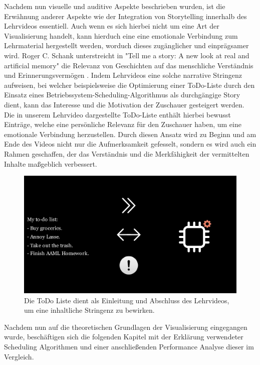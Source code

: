 Nachdem nun visuelle und auditive Aspekte beschrieben wurden, ist die Erwähnung anderer Aspekte wie der Integration von Storytelling innerhalb des Lehrvideos essentiell. Auch wenn es sich hierbei nicht um eine Art der Visualisierung handelt, kann hierduch eine eine emotionale Verbindung zum Lehrmaterial hergestellt werden, worduch dieses zugänglicher und einprägsamer wird. Roger C. Schank unterstreicht in "Tell me a story: A new look at real and artificial memory" die Relevanz von Geschichten auf das menschliche Verständnis und Erinnerungsvermögen \autocite{schank_tell_1990}. Indem Lehrvideos eine solche narrative Stringenz aufweisen, bei welcher beispielsweise die Optimierung einer ToDo-Liste durch den Einsatz eines Betriebssystem-Scheduling-Algorithmus als durchgängige Story dient, kann das Interesse und die Motivation der Zuschauer gesteigert werden. Die in unserem Lehrvideo dargestellte ToDo-Liste enthält hierbei bewusst Einträge, welche eine persönliche Relevanz für den Zuschauer haben, um eine emotionale Verbindung herzustellen. Durch diesen Ansatz wird zu Beginn und am Ende des Videos nicht nur die Aufmerksamkeit gefesselt, sondern es wird auch ein Rahmen geschaffen, der das Verständnis und die Merkfähigkeit der vermittelten Inhalte maßgeblich verbessert.


\begin{figure}[h]
	\centering
	\includegraphics[width=0.8\linewidth]{img/screen_todo.png} 
	\caption{Die ToDo Liste dient als Einleitung und Abschluss des Lehrvideos, um eine inhaltliche Stringenz zu bewirken.}
	\label{fig:screen_todo} 
\end{figure}


Nachdem nun auf die theoretischen Grundlagen der Visualisierung eingegangen wurde, beschäftigen sich die folgenden Kapitel mit der Erklärung verwendeter Scheduling Algorithmen und einer anschließenden Performance Analyse dieser im Vergleich.


